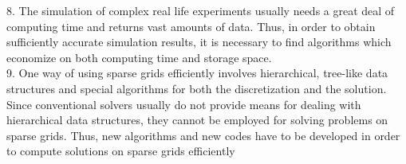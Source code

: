 8. The simulation of complex real life experiments usually needs a great deal of computing time and returns vast amounts of data. Thus, in order to obtain sufficiently accurate simulation results, it is necessary to find algorithms which economize on both computing time and storage space.\cite{Griebel1995} \\

9. One way of using sparse grids efficiently involves hierarchical, tree-like data structures and special algorithms for both the discretization and the solution. Since conventional solvers usually do not provide means for dealing with hierarchical data structures, they cannot be employed for solving problems on sparse grids. Thus, new algorithms and new codes have to be developed in order to compute solutions on sparse grids efficiently 
